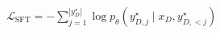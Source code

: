 \documentclass[border=2pt]{standalone}
\begin{document}
\color{FormulaNavy}
\fontsize{38}{46}\selectfont
$\displaystyle \mathcal{L}_{\mathrm{SFT}}=-\sum_{j=1}^{|y_D^\star|}\log p_\theta\!\left(y_{D,j}^\star\mid x_D,y_{D,<j}^\star\right)$
\end{document}
